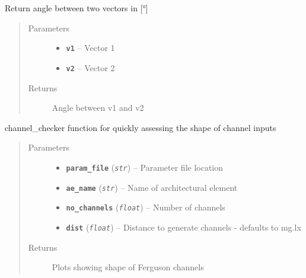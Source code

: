 \documentclass[letterpaper,10pt,english]{sphinxmanual}
\begin{document}
\begin{fulllineitems}
\label{hyvr:hyvr.hyvr.sim.angle}
Return angle between two vectors in {[}°{]}
\begin{quote}\begin{description}
\item[{Parameters}] \leavevmode\begin{itemize}
\item {} 
\textbf{\texttt{v1}} -- Vector 1

\item {} 
\textbf{\texttt{v2}} -- Vector 2

\end{itemize}

\item[{Returns}] \leavevmode
Angle between v1 and v2

\end{description}\end{quote}

\end{fulllineitems}


\begin{fulllineitems}
\label{hyvr:hyvr.hyvr.sim.channel_checker}
channel\_checker function for quickly assessing the shape of channel inputs
\begin{quote}\begin{description}
\item[{Parameters}] \leavevmode\begin{itemize}
\item {} 
\textbf{\texttt{param\_file}} (\emph{\texttt{str}}) -- Parameter file location

\item {} 
\textbf{\texttt{ae\_name}} (\emph{\texttt{str}}) -- Name of architectural element

\item {} 
\textbf{\texttt{no\_channels}} (\emph{\texttt{float}}) -- Number of channels

\item {} 
\textbf{\texttt{dist}} (\emph{\texttt{float}}) -- Distance to generate channels - defaults to mg.lx

\end{itemize}

\item[{Returns}] \leavevmode
Plots showing shape of Ferguson channels

\end{description}\end{quote}

\end{fulllineitems}
\end{document}
